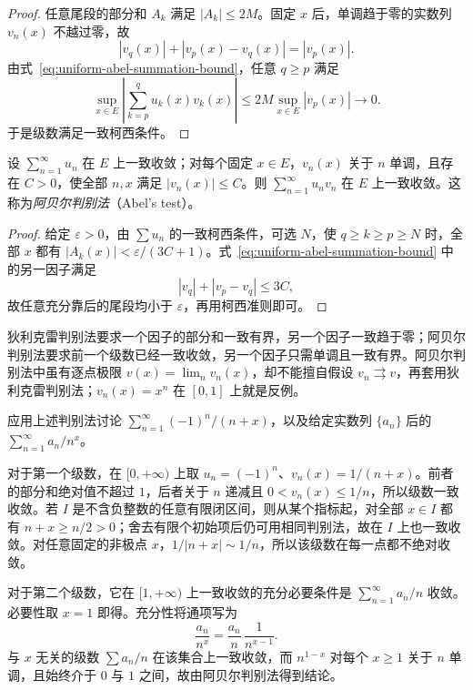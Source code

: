 \documentclass[UTF8,12pt,a4paper,fontset=fandol]{ctexbook}
\begin{document}
\begin{proof}
任意尾段的部分和 $A_k$ 满足 $|A_k|\leq2M$。固定 $x$ 后，单调趋于零的实数列 $v_n(x)$ 不越过零，故
\[
    |v_q(x)|+|v_p(x)-v_q(x)|=|v_p(x)|.
\]
由式~\eqref{eq:uniform-abel-summation-bound}，任意 $q\geq p$ 满足
\[
    \sup_{x\in E}\left|\sum_{k=p}^qu_k(x)v_k(x)\right|
    \leq2M\sup_{x\in E}|v_p(x)|\longrightarrow0.
\]
于是级数满足一致柯西条件。
\end{proof}

\begin{theorem}[阿贝尔判别法]
\label{thm:uniform-abel-test}
设 $\sum_{n=1}^\infty u_n$ 在 $E$ 上一致收敛；对每个固定 $x\in E$，$v_n(x)$ 关于 $n$ 单调，且存在 $C>0$，使全部 $n,x$ 满足 $|v_n(x)|\leq C$。则 $\sum_{n=1}^\infty u_nv_n$ 在 $E$ 上一致收敛。这称为\emph{阿贝尔判别法}（Abel's test）。
\end{theorem}

\begin{proof}
给定 $\varepsilon>0$，由 $\sum u_n$ 的一致柯西条件，可选 $N$，使 $q\geq k\geq p\geq N$ 时，全部 $x$ 都有 $|A_k(x)|<\varepsilon/(3C+1)$。式~\eqref{eq:uniform-abel-summation-bound} 中的另一因子满足
\[
    |v_q|+|v_p-v_q|\leq3C,
\]
故任意充分靠后的尾段均小于 $\varepsilon$，再用柯西准则即可。
\end{proof}

狄利克雷判别法要求一个因子的部分和一致有界，另一个因子一致趋于零；阿贝尔判别法要求前一个级数已经一致收敛，另一个因子只需单调且一致有界。阿贝尔判别法中虽有逐点极限 $v(x)=\lim_n v_n(x)$，却不能擅自假设 $v_n\rightrightarrows v$，再套用狄利克雷判别法；$v_n(x)=x^n$ 在 $[0,1]$ 上就是反例。

\begin{example}
\label{ex:uniform-dirichlet-and-abel-applications}
应用上述判别法讨论 $\sum_{n=1}^\infty(-1)^n/(n+x)$，以及给定实数列 $\{a_n\}$ 后的 $\sum_{n=1}^\infty a_n/n^x$。
\end{example}

\begin{solve}
对于第一个级数，在 $[0,+\infty)$ 上取 $u_n=(-1)^n$、$v_n(x)=1/(n+x)$。前者的部分和绝对值不超过 $1$，后者关于 $n$ 递减且 $0<v_n(x)\leq1/n$，所以级数一致收敛。若 $I$ 是不含负整数的任意有限闭区间，则从某个指标起，对全部 $x\in I$ 都有 $n+x\geq n/2>0$；舍去有限个初始项后仍可用相同判别法，故在 $I$ 上也一致收敛。对任意固定的非极点 $x$，$1/|n+x|\sim1/n$，所以该级数在每一点都不绝对收敛。

对于第二个级数，它在 $[1,+\infty)$ 上一致收敛的充分必要条件是 $\sum_{n=1}^\infty a_n/n$ 收敛。必要性取 $x=1$ 即得。充分性将通项写为
\[
    \frac{a_n}{n^x}=\frac{a_n}{n}\,\frac1{n^{x-1}}.
\]
与 $x$ 无关的级数 $\sum a_n/n$ 在该集合上一致收敛，而 $n^{1-x}$ 对每个 $x\geq1$ 关于 $n$ 单调，且始终介于 $0$ 与 $1$ 之间，故由阿贝尔判别法得到结论。
\end{solve}
\end{document}
